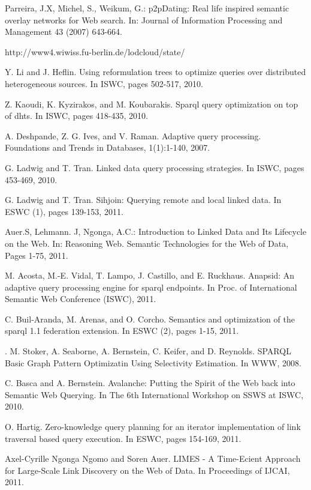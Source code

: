 \documentclass{sig-alternate}  %
\begin{document}
\begin{thebibliography}{10}
Parreira, J.X, Michel, S., Weikum, G.: p2pDating:
Real life inspired semantic overlay networks for Web search. In: Journal
of Information Processing and Management 43 (2007) 643-664.

 http://www4.wiwiss.fu-berlin.de/lodcloud/state/

Y. Li and J. Hefl{}in. Using reformulation trees
to optimize queries over distributed heterogeneous sources. In ISWC,
pages 502-517, 2010.

Z. Kaoudi, K. Kyzirakos, and M. Koubarakis. Sparql
query optimization on top of dhts. In ISWC, pages 418-435, 2010.

A. Deshpande, Z. G. Ives, and V. Raman. Adaptive
query processing. Foundations and Trends in Databases, 1(1):1-140,
2007.

 G. Ladwig and T. Tran. Linked data query processing
strategies. In ISWC, pages 453-469, 2010.

G. Ladwig and T. Tran. Sihjoin: Querying remote and
local linked data. In ESWC (1), pages 139-153, 2011.

Auer.S, Lehmann. J, Ngonga, A.C.: Introduction to
Linked Data and Its Lifecycle on the Web. In: Reasoning Web. Semantic
Technologies for the Web of Data, Pages 1-75, 2011.

M. Acosta, M.-E. Vidal, T. Lampo, J. Castillo, and
E. Ruckhaus. Anapsid: An adaptive query processing engine for sparql
endpoints. In Proc. of International Semantic Web Conference (ISWC),
2011.

C. Buil-Aranda, M. Arenas, and O. Corcho. Semantics
and optimization of the sparql 1.1 federation extension. In ESWC (2),
pages 1-15, 2011.

. M. Stoker, A. Seaborne, A. Bernstein, C. Keifer,
and D. Reynolds. SPARQL Basic Graph Pattern Optimizatin Using Selectivity
Estimation. In WWW, 2008.

C. Basca and A. Bernstein. Avalanche: Putting the
Spirit of the Web back into Semantic Web Querying. In The 6th International
Workshop on SSWS at ISWC, 2010.

O. Hartig. Zero-knowledge query planning for an iterator
implementation of link traversal based query execution. In ESWC, pages
154-169, 2011.

Axel-Cyrille Ngonga Ngomo and Soren Auer. LIMES -
A Time-Ecient Approach for Large-Scale Link Discovery on the Web of
Data. In Proceedings of IJCAI, 2011.


\end{thebibliography}
\end{document}
